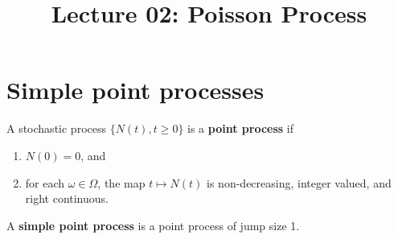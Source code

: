 \documentclass[a4paper,10pt,english]{article}
\title{Lecture 02: Poisson Process}
\author{}
\begin{document}
\maketitle

\section{Simple point processes}
\begin{defn} A stochastic process $\{N(t), t\geqslant 0\}$ is a \textbf{point process} if
\begin{enumerate}
  \item $N(0) = 0$, and 
  \item for each $\omega \in \Omega$, the map $t\mapsto N(t)$ is non-decreasing, integer valued, and right continuous.%
\end{enumerate}
\end{defn} 
\begin{defn} A \textbf{simple point process} is a point process of jump size 1.
\end{defn}
\end{document}

